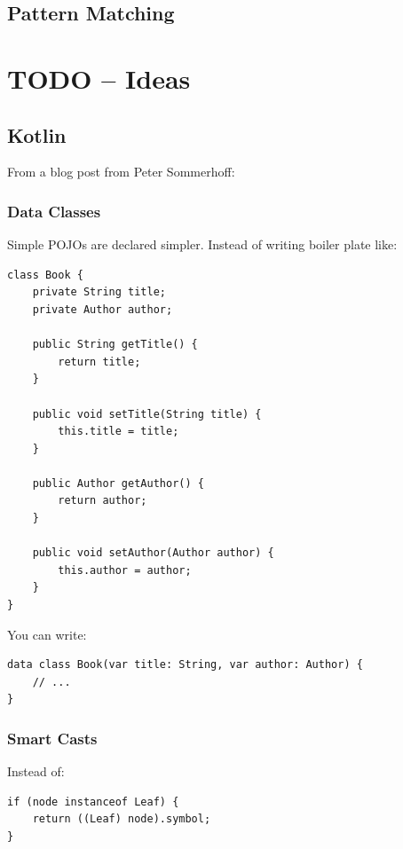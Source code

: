 \documentclass[11pt, a4paper]{report}
\begin{document}

\section{Pattern Matching}


\chapter{TODO -- Ideas}

\section{Kotlin}

From a blog post from Peter Sommerhoff\cite{kotlin-sommerhoff}:

\subsection{Data Classes}

Simple POJOs are declared simpler. Instead of writing boiler plate like:

\begin{lstlisting}
class Book {
    private String title;
    private Author author;

    public String getTitle() {
        return title;
    }
    
    public void setTitle(String title) {
        this.title = title;
    }

    public Author getAuthor() {
        return author;
    }
    
    public void setAuthor(Author author) {
        this.author = author;
    }
}
\end{lstlisting}

You can write:

\begin{lstlisting}
data class Book(var title: String, var author: Author) {
    // ...
}
\end{lstlisting}

\subsection{Smart Casts}

Instead of:

\begin{lstlisting}
if (node instanceof Leaf) {
    return ((Leaf) node).symbol;
}
\end{lstlisting}
\end{document}
